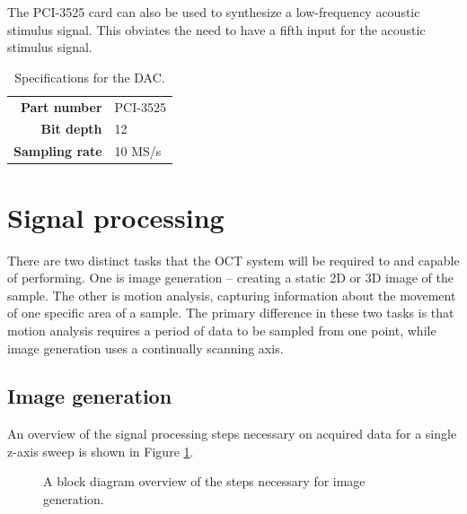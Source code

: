 The PCI-3525 card can also be used to synthesize a low-frequency acoustic stimulus signal. This obviates the need to have a fifth input for the acoustic stimulus signal.

\begin{table}[h!]
\centering
\begin{tabular}{ >{\bf}r | l}
Part number & PCI-3525 \\
Bit depth & 12 \\
Sampling rate & 10 MS/s \\
\end{tabular}
\caption{Specifications for the DAC. \label{table:dac}}
\end{table}

\section{Signal processing}
\label{sec:sig_proc}

There are two distinct tasks that the OCT system will be required to and capable of performing. One is image generation -- creating a static 2D or 3D image of the sample. The other is motion analysis, capturing information about the movement of one specific area of a sample. The primary difference in these two tasks is that motion analysis requires a period of data to be sampled from one point, while image generation uses a continually scanning axis.


\subsection{Image generation}

An overview of the signal processing steps necessary on acquired data for a single z-axis sweep is shown in Figure \ref{fig:imagegen}.

\begin{figure}[h!]
  \centering
{}
\caption{A block diagram overview of the steps necessary for image generation. \label{fig:imagegen}}
\end{figure}

